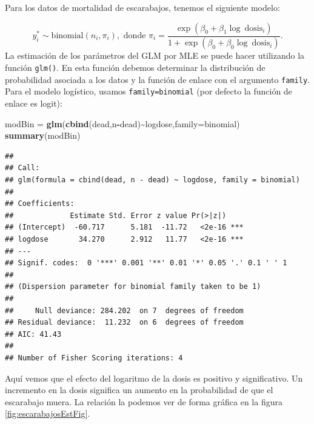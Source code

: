 \documentclass[
]{article}
\newenvironment{Shaded}{\begin{snugshade}}{\end{snugshade}}
\newcommand{\AttributeTok}[1]{\textcolor[rgb]{0.13,0.29,0.53}{#1}}
\newcommand{\FunctionTok}[1]{\textcolor[rgb]{0.13,0.29,0.53}{\textbf{#1}}}
\newcommand{\NormalTok}[1]{#1}
\newcommand{\OtherTok}[1]{\textcolor[rgb]{0.56,0.35,0.01}{#1}}
\newcommand{\SpecialCharTok}[1]{\textcolor[rgb]{0.81,0.36,0.00}{\textbf{#1}}}
\begin{document}
Para los datos de mortalidad de escarabajos, tenemos el siguiente modelo:

\[
y_i^* \sim \mbox{binomial}(n_i,\pi_i), \mbox{ donde } \pi_{i}=\frac{\exp(\beta_0+\beta_1\log\ \text{dosis}_i)}{1+\exp(\beta_0+\beta_0\log\ \text{dosis}_i)}.
\]
La estimación de los parámetros del GLM por MLE se puede hacer utilizando la función \texttt{glm()}. En esta función debemos determinar la distribución de probabilidad asociada a los datos y la función de enlace con el argumento \texttt{family}. Para el modelo logístico, usamos \texttt{family=binomial} (por defecto la función de enlace es logit):

\begin{Shaded}
\begin{Highlighting}[]
\NormalTok{modBin }\OtherTok{=} \FunctionTok{glm}\NormalTok{(}\FunctionTok{cbind}\NormalTok{(dead,n}\SpecialCharTok{{-}}\NormalTok{dead)}\SpecialCharTok{\textasciitilde{}}\NormalTok{logdose,}\AttributeTok{family=}\NormalTok{binomial)}
\FunctionTok{summary}\NormalTok{(modBin)}
\end{Highlighting}
\end{Shaded}

\begin{verbatim}
## 
## Call:
## glm(formula = cbind(dead, n - dead) ~ logdose, family = binomial)
## 
## Coefficients:
##             Estimate Std. Error z value Pr(>|z|)    
## (Intercept)  -60.717      5.181  -11.72   <2e-16 ***
## logdose       34.270      2.912   11.77   <2e-16 ***
## ---
## Signif. codes:  0 '***' 0.001 '**' 0.01 '*' 0.05 '.' 0.1 ' ' 1
## 
## (Dispersion parameter for binomial family taken to be 1)
## 
##     Null deviance: 284.202  on 7  degrees of freedom
## Residual deviance:  11.232  on 6  degrees of freedom
## AIC: 41.43
## 
## Number of Fisher Scoring iterations: 4
\end{verbatim}

Aquí vemos que el efecto del logaritmo de la dosis es positivo y significativo. Un incremento en la dosis significa un aumento en la probabilidad de que el escarabajo muera. La relación la podemos ver de forma gráfica en la figura \ref{fig:escarabajosEstFig}.
\end{document}
